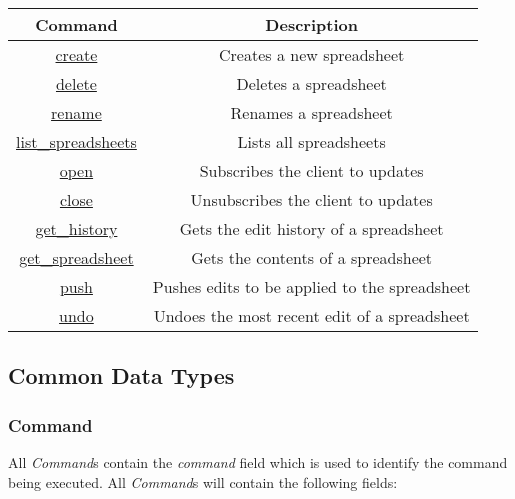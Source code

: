 \begin{table}[H]
    \begin{center}
        \begin{tabular}{|c|c|}\hline
        Command & Description \\\hline
        \hyperref[sec:message:create]{create} & Creates a new spreadsheet \\\hline
        \hyperref[sec:message:delete]{delete} & Deletes a spreadsheet \\\hline
        \hyperref[sec:message:rename]{rename} & Renames a spreadsheet \\\hline
        \hyperref[sec:message:list]{list\_spreadsheets} & Lists all spreadsheets \\\hline
        \hyperref[sec:message:open]{open} & Subscribes the client to updates \\\hline
        \hyperref[sec:message:close]{close} & Unsubscribes the client to updates \\\hline
        \hyperref[sec:message:get_history]{get\_history} & Gets the edit history of a spreadsheet \\\hline
        \hyperref[sec:message:get_spreadsheet]{get\_spreadsheet} & Gets the contents of a spreadsheet \\\hline
        \hyperref[sec:message:push]{push} & Pushes edits to be applied to the spreadsheet \\\hline
        \hyperref[sec:message:undo]{undo} & Undoes the most recent edit of a spreadsheet \\\hline
        \end{tabular}
    \end{center}
\end{table}

\lstset{language=json,frame=single,numbers=none,captionpos=b}

\subsection{Common Data Types}

\subsubsection{Command}
\label{sec:message:command}

All \emph{Command}s contain the \emph{command} field which is used to identify the command being executed.
All \emph{Command}s will contain the following fields:

